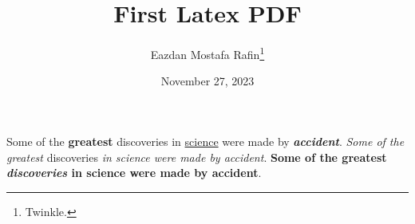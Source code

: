 \documentclass[12pt, a4paper]{article}
\title{First Latex PDF}
\author{Eazdan Mostafa Rafin\thanks{Twinkle.}}
\date{November 27, 2023}
\begin{document}
\maketitle
Some of the {\bf greatest} discoveries in \underline{science} were made by \textbf{\textit {accident}}.
\emph{Some of the greatest} discoveries \emph{in science were made by accident}.
\textbf{Some of the greatest \emph{discoveries} in science were made by accident}.
\end{document}
